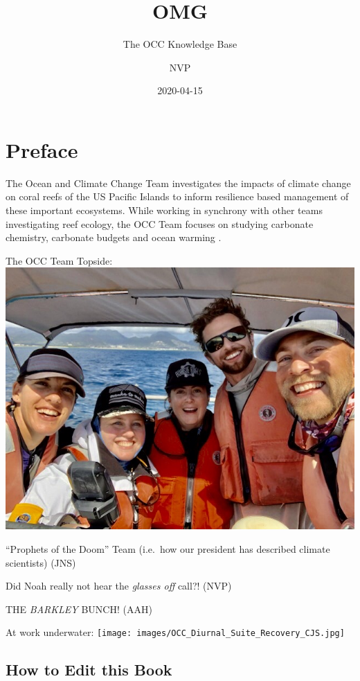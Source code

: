 \documentclass[]{book}
\title{OMG}
\subtitle{The OCC Knowledge Base}
\author{NVP}
\date{2020-04-15}
\begin{document}
\maketitle

{
\setcounter{tocdepth}{1}
\tableofcontents
}
\hypertarget{preface}{%
\chapter*{Preface}\label{preface}}

The Ocean and Climate Change Team investigates the impacts of climate change on coral reefs of the US Pacific Islands to inform resilience based management of these important ecosystems. While working in synchrony with other teams investigating reef ecology, the OCC Team focuses on studying carbonate chemistry, carbonate budgets and ocean warming .

The OCC Team Topside:
\includegraphics{images/OCC_Team_March_2020.jpg}

``Prophets of the Doom'' Team (i.e.~how our president has described climate scientists) (JNS)

Did Noah really not hear the \emph{glasses off} call?! (NVP)

THE \emph{BARKLEY} BUNCH! (AAH)

At work underwater:
\texttt{[image: images/OCC\_Diurnal\_Suite\_Recovery\_CJS.jpg]}

\hypertarget{how-to-edit-this-book}{%
\section*{How to Edit this Book}\label{how-to-edit-this-book}}
\end{document}
